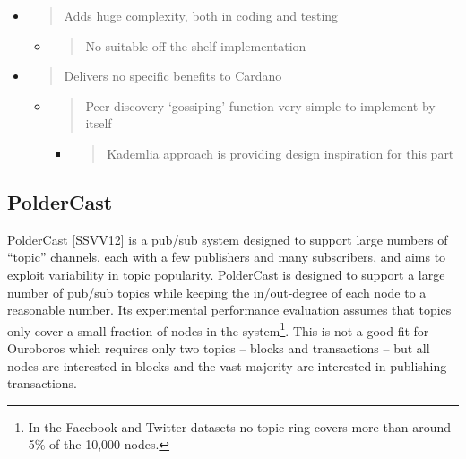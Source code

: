 \documentclass[11pt,a4paper]{article}
\begin{document}
\begin{itemize}
\item
  \begin{quote}
  Adds huge complexity, both in coding and testing
  \end{quote}

  \begin{itemize}
  \item
    \begin{quote}
    No suitable off-the-shelf implementation
    \end{quote}
  \end{itemize}
\item
  \begin{quote}
  Delivers no specific benefits to Cardano
  \end{quote}

  \begin{itemize}
  \item
    \begin{quote}
    Peer discovery `gossiping' function very simple to implement by
    itself
    \end{quote}

    \begin{itemize}
    \item
      \begin{quote}
      Kademlia approach is providing design inspiration for this part
      \end{quote}
    \end{itemize}
  \end{itemize}
\end{itemize}

\subsection{PolderCast}
\label{poldercast-1}

PolderCast {[}SSVV12{]} is a pub/sub system designed to support large
numbers of ``topic'' channels, each with a few publishers and many
subscribers, and aims to exploit variability in topic popularity.
PolderCast is designed to support a large number of pub/sub topics while
keeping the in/out-degree of each node to a reasonable number. Its
experimental performance evaluation assumes that topics only cover a
small fraction of nodes in the system\footnote{In the Facebook and
  Twitter datasets no topic ring covers more than around 5\% of the
  10,000 nodes.}. This is not a good fit for Ouroboros which requires
only two topics -- blocks and transactions -- but all nodes are
interested in blocks and the vast majority are interested in publishing
transactions.
\end{document}
